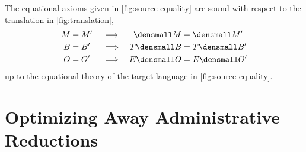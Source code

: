 \documentclass[runningheads]{llncs}
\begin{document}
\begin{proposition}[Soundness]
  The equational axioms given in \cref{fig:source-equality} are sound with
  respect to the translation in \cref{fig:translation},
  \begin{align*}
    M &= M' &&\implies & \den{M} &= \den{M'} \\
    B &= B' &&\implies & T\den{B} &= T\den{B'} \\
    O &= O' &&\implies & E\den{O} &= E\den{O'}
  \end{align*}
  up to the equational theory of the target language in
  \cref{fig:source-equality}.
\end{proposition}

\section{Optimizing Away Administrative Reductions}
\end{document}

